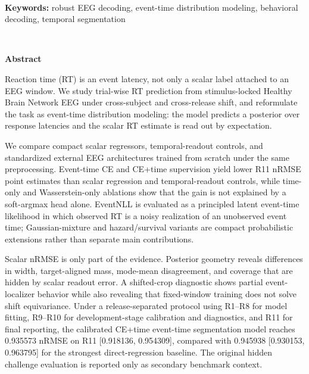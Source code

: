 \documentclass[12pt]{article}
\begin{document}
\ \\[-2mm]
{\bf Keywords:} robust EEG decoding, event-time distribution modeling, behavioral decoding, temporal segmentation

\thispagestyle{empty}
%
\ \vspace{-0mm}\\
%
\begin{center} {\bf Abstract} \end{center}



Reaction time (RT) is an event latency, not only a scalar label attached to an EEG window. We study trial-wise RT prediction from stimulus-locked Healthy Brain Network EEG under cross-subject and cross-release shift, and reformulate the task as event-time distribution modeling: the model predicts a posterior over response latencies and the scalar RT estimate is read out by expectation.

We compare compact scalar regressors, temporal-readout controls, and standardized external EEG architectures trained from scratch under the same preprocessing. Event-time CE and CE+time supervision yield lower R11 nRMSE point estimates than scalar regression and temporal-readout controls, while time-only and Wasserstein-only ablations show that the gain is not explained by a soft-argmax head alone. EventNLL is evaluated as a principled latent event-time likelihood in which observed RT is a noisy realization of an unobserved event time; Gaussian-mixture and hazard/survival variants are compact probabilistic extensions rather than separate main contributions.

Scalar nRMSE is only part of the evidence. Posterior geometry reveals differences in width, target-aligned mass, mode-mean disagreement, and coverage that are hidden by scalar readout error. A shifted-crop diagnostic shows partial event-localizer behavior while also revealing that fixed-window training does not solve shift equivariance. Under a release-separated protocol using R1--R8 for model fitting, R9--R10 for development-stage calibration and diagnostics, and R11 for final reporting, the calibrated CE+time event-time segmentation model reaches 0.935573 nRMSE on R11 [0.918136, 0.954309], compared with 0.945938 [0.930153, 0.963795] for the strongest direct-regression baseline. The original hidden challenge evaluation is reported only as secondary benchmark context.
\end{document}
